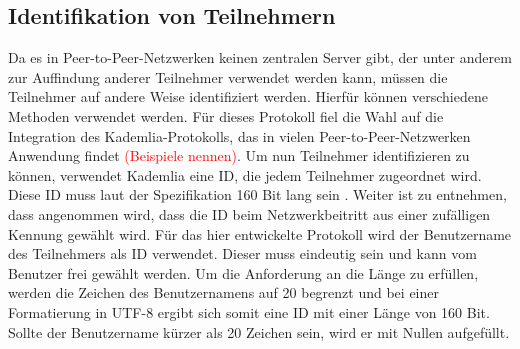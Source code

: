 \subsection{Identifikation von Teilnehmern}
\label{subsec:identifikation_von_teilnehmern}


\noindent Da es in Peer-to-Peer-Netzwerken keinen zentralen Server gibt, der unter anderem zur Auffindung anderer Teilnehmer verwendet werden kann, müssen die Teilnehmer auf andere Weise identifiziert werden. Hierfür können verschiedene Methoden verwendet werden. Für dieses Protokoll fiel die Wahl auf die Integration des Kademlia-Protokolls, das in vielen Peer-to-Peer-Netzwerken Anwendung findet \textcolor{red}{(Beispiele nennen)}. Um nun Teilnehmer identifizieren zu können, verwendet Kademlia eine ID, die jedem Teilnehmer zugeordnet wird. Diese ID muss laut der Spezifikation 160 Bit lang sein \Parencite[S. 2]{Maymounkov_Kademlia}. Weiter ist zu entnehmen, dass angenommen wird, dass die ID beim Netzwerkbeitritt aus einer zufälligen Kennung gewählt wird. Für das hier entwickelte Protokoll wird der Benutzername des Teilnehmers als ID verwendet. Dieser muss eindeutig sein und kann vom Benutzer frei gewählt werden. Um die Anforderung an die Länge zu erfüllen, werden die Zeichen des Benutzernamens auf 20 begrenzt und bei einer Formatierung in UTF-8 ergibt sich somit eine ID mit einer Länge von 160 Bit. Sollte der Benutzername kürzer als 20 Zeichen sein, wird er mit Nullen aufgefüllt.
